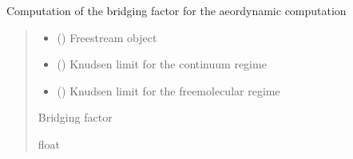 \documentclass[letterpaper,10pt,english]{sphinxmanual}
\begin{document}
\begin{fulllineitems}
\label{\detokenize{modules:aerothermo.bridging}}
\pysigstartsignatures
{}
\pysigstopsignatures
\sphinxAtStartPar
Computation of the bridging factor for the aeordynamic computation
\begin{quote}\begin{description}
\begin{itemize}
\item {} 
\sphinxAtStartPar
{} () \textendash{} Freestream object

\item {} 
\sphinxAtStartPar
{} () \textendash{} Knudsen limit for the continuum regime

\item {} 
\sphinxAtStartPar
{} () \textendash{} Knudsen limit for the free\sphinxhyphen{}molecular regime

\end{itemize}

\sphinxAtStartPar
{} \textendash{} Bridging factor

\sphinxAtStartPar
float

\end{description}\end{quote}

\end{fulllineitems}

\end{document}
